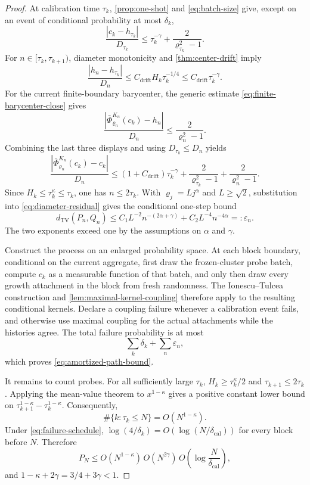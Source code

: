 \documentclass[11pt]{article}
\theoremstyle{mainthm}
\theoremstyle{definition}
\theoremstyle{remark}
\newcommand{\dTV}{d_{\mathrm{TV}}}
\begin{document}
\begin{proof}
At calibration time $\tau_k$, \cref{prop:one-shot} and
\eqref{eq:batch-size} give, except on an event of conditional probability
at most $\delta_k$,
\begin{equation}
  \frac{|c_k-h_{\tau_k}|}{D_{\tau_k}}
  \le \tau_k^{-\gamma}
  +\frac{2}{\varrho_{\tau_k}^2-1}.
  \label{eq:block-initial-center}
\end{equation}
For $n\in[\tau_k,\tau_{k+1})$, diameter monotonicity and
\cref{thm:center-drift} imply
\begin{equation}
  \frac{|h_n-h_{\tau_k}|}{D_n}
  \le C_{\mathrm{drift}}H_k\tau_k^{-1/4}
  \le C_{\mathrm{drift}}\tau_k^{-\gamma}.
  \label{eq:block-drift}
\end{equation}
For the current finite-boundary barycenter, the generic estimate
\eqref{eq:finite-barycenter-close} gives
\[
  \frac{|\bar\Phi_{\varrho_n}^{K_n}(c_k)-h_n|}{D_n}
  \le\frac{2}{\varrho_n^2-1}.
\]
Combining the last three displays and using $D_{\tau_k}\le D_n$ yields
\begin{equation}
  \frac{|\bar\Phi_{\varrho_n}^{K_n}(c_k)-c_k|}{D_n}
  \le
  (1+C_{\mathrm{drift}})\tau_k^{-\gamma}
  +\frac{2}{\varrho_{\tau_k}^2-1}
  +\frac{2}{\varrho_n^2-1}.
  \label{eq:stale-residual}
\end{equation}
Since $H_k\le\tau_k^\kappa\le\tau_k$, one has $n\le2\tau_k$.
With $\varrho_j=Lj^\alpha$ and $L\ge\sqrt2$, substitution into
\eqref{eq:diameter-residual} gives the conditional one-step bound
\begin{equation}
  \dTV(P_n,Q_n)
  \le
  C_1L^{-2}n^{-(2\alpha+\gamma)}
  +C_2L^{-4}n^{-4\alpha}
  =:\varepsilon_n.
  \label{eq:amortized-local}
\end{equation}
The two exponents exceed one by the assumptions on $\alpha$ and $\gamma$.

Construct the process on an enlarged probability space. At each block
boundary, conditional on the current aggregate, first draw the frozen-cluster
probe batch, compute $c_k$ as a measurable function of that batch, and only
then draw every growth attachment in the block from fresh randomness.
The Ionescu--Tulcea construction and \cref{lem:maximal-kernel-coupling}
therefore apply to the resulting conditional kernels. Declare a coupling
failure whenever a calibration event fails, and otherwise use maximal
coupling for the actual attachments while the histories agree. The total
failure probability is at most
\[
  \sum_k\delta_k+\sum_n\varepsilon_n,
\]
which proves \eqref{eq:amortized-path-bound}.

It remains to count probes. For all sufficiently large $\tau_k$,
$H_k\ge\tau_k^\kappa/2$ and $\tau_{k+1}\le2\tau_k$. Applying the mean-value theorem to $x^{1-\kappa}$ gives a positive constant lower bound on
$\tau_{k+1}^{1-\kappa}-\tau_k^{1-\kappa}$. Consequently,
\[
  \#\{k:\tau_k\le N\}=O(N^{1-\kappa}).
\]
Under \eqref{eq:failure-schedule},
$\log(4/\delta_k)=O(\log(N/\delta_{\mathrm{cal}}))$ for every block before $N$.
Therefore
\[
  P_N
  \le
  O(N^{1-\kappa})\,
  O(N^{2\gamma})\,
  O\!\left(\log\frac{N}{\delta_{\mathrm{cal}}}\right),
\]
and $1-\kappa+2\gamma=3/4+3\gamma<1$.
\end{proof}
\end{document}
